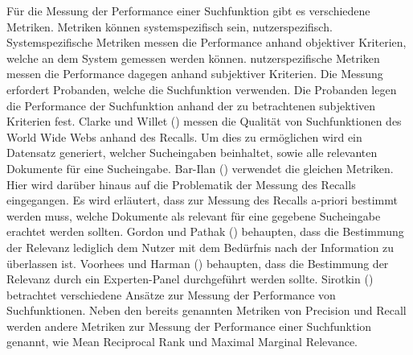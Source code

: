 
Für die Messung der Performance einer Suchfunktion gibt es verschiedene Metriken.
Metriken können systemspezifisch sein, nutzerspezifisch.
Systemspezifische Metriken messen die Performance anhand objektiver Kriterien, welche an dem System gemessen werden können.
nutzerspezifische Metriken messen die Performance dagegen anhand subjektiver Kriterien.
Die Messung erfordert Probanden, welche die Suchfunktion verwenden.
Die Probanden legen die Performance der Suchfunktion anhand der zu betrachtenen subjektiven Kriterien fest.
Clarke und Willet (\citeyear{Clarke_Willett_1997}) messen die Qualität von Suchfunktionen des World Wide Webs anhand des Recalls.
Um dies zu ermöglichen wird ein Datensatz generiert, welcher Sucheingaben beinhaltet, sowie alle relevanten Dokumente für eine Sucheingabe.
Bar-Ilan (\citeyear{Bar-Ilan_2002}) verwendet die gleichen Metriken.
Hier wird darüber hinaus auf die Problematik der Messung des Recalls eingegangen.
Es wird erläutert, dass zur Messung des Recalls a-priori bestimmt werden muss, welche Dokumente als relevant für eine gegebene Sucheingabe erachtet werden sollten.
Gordon und Pathak (\citeyear{Gordon_Pathak_1999}) behaupten, dass die Bestimmung der Relevanz lediglich dem Nutzer mit dem Bedürfnis nach der Information zu überlassen ist.
Voorhees und Harman (\citeyear{Voorhees_Harman_2001}) behaupten, dass die Bestimmung der Relevanz durch ein Experten-Panel durchgeführt werden sollte.
Sirotkin (\citeyear{Sirotkin_2012}) betrachtet verschiedene Ansätze zur Messung der Performance von Suchfunktionen.
Neben den bereits genannten Metriken von Precision und Recall werden andere Metriken zur Messung der Performance einer Suchfunktion genannt, wie Mean Reciprocal Rank und Maximal Marginal Relevance.\\
